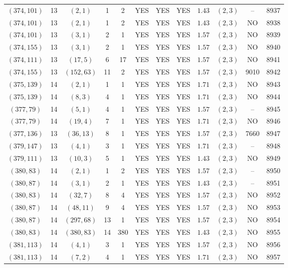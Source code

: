 \begin{longtable}{|c|c|c|c|c|c|c|c|c|c|c|c|}
$(374,101)$ & 13 & $(2,1)$ & 1 & 2 & YES & YES & YES & $1.43$ & $(2,3)$ & -- & 8937\\
$(374,101)$ & 13 & $(2,1)$ & 1 & 2 & YES & YES & YES & $1.43$ & $(2,3)$ & NO & 8938\\
$(374,101)$ & 13 & $(3,1)$ & 2 & 1 & YES & YES & YES & $1.57$ & $(2,3)$ & NO & 8939\\
$(374,155)$ & 13 & $(3,1)$ & 2 & 1 & YES & YES & YES & $1.57$ & $(2,3)$ & NO & 8940\\
$(374,111)$ & 13 & $(17,5)$ & 6 & 17 & YES & YES & YES & $1.57$ & $(2,3)$ & NO & 8941\\
$(374,155)$ & 13 & $(152,63)$ & 11 & 2 & YES & YES & YES & $1.57$ & $(2,3)$ & 9010 & 8942\\
$(375,139)$ & 14 & $(2,1)$ & 1 & 1 & YES & YES & YES & $1.71$ & $(2,3)$ & NO & 8943\\
$(375,139)$ & 14 & $(8,3)$ & 4 & 1 & YES & YES & YES & $1.71$ & $(2,3)$ & NO & 8944\\
$(377,79)$ & 14 & $(5,1)$ & 4 & 1 & YES & YES & YES & $1.57$ & $(2,3)$ & -- & 8945\\
$(377,79)$ & 14 & $(19,4)$ & 7 & 1 & YES & YES & YES & $1.71$ & $(2,3)$ & NO & 8946\\
$(377,136)$ & 13 & $(36,13)$ & 8 & 1 & YES & YES & YES & $1.57$ & $(2,3)$ & 7660 & 8947\\
$(379,147)$ & 13 & $(4,1)$ & 3 & 1 & YES & YES & YES & $1.71$ & $(2,3)$ & -- & 8948\\
$(379,111)$ & 13 & $(10,3)$ & 5 & 1 & YES & YES & YES & $1.43$ & $(2,3)$ & NO & 8949\\
$(380,83)$ & 14 & $(2,1)$ & 1 & 2 & YES & YES & YES & $1.57$ & $(2,3)$ & -- & 8950\\
$(380,87)$ & 14 & $(3,1)$ & 2 & 1 & YES & YES & YES & $1.43$ & $(2,3)$ & -- & 8951\\
$(380,83)$ & 14 & $(32,7)$ & 8 & 4 & YES & YES & YES & $1.57$ & $(2,3)$ & NO & 8952\\
$(380,87)$ & 14 & $(48,11)$ & 9 & 4 & YES & YES & YES & $1.57$ & $(2,3)$ & NO & 8953\\
$(380,87)$ & 14 & $(297,68)$ & 13 & 1 & YES & YES & YES & $1.57$ & $(2,3)$ & NO & 8954\\
$(380,83)$ & 14 & $(380,83)$ & 14 & 380 & YES & YES & YES & $1.43$ & $(2,3)$ & NO & 8955\\
$(381,113)$ & 14 & $(4,1)$ & 3 & 1 & YES & YES & YES & $1.57$ & $(2,3)$ & NO & 8956\\
$(381,113)$ & 14 & $(7,2)$ & 4 & 1 & YES & YES & YES & $1.71$ & $(2,3)$ & NO & 8957\\

\end{longtable}
